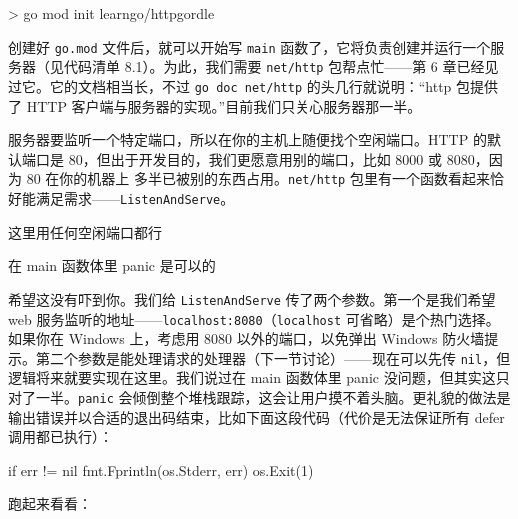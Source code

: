 \begin{shellcode}[]
> go mod init learngo/httpgordle
\end{shellcode}

创建好 \texttt{go.mod} 文件后，就可以开始写 \texttt{main} 函数了，它将负责创建并运行一个服务器（见代码清单 8.1）。为此，我们需要 \texttt{net/http} 包帮点忙——第 6 章已经见过它。它的文档相当长，不过 \texttt{go doc net/http} 的头几行就说明：``http 包提供了 HTTP 客户端与服务器的实现。''目前我们只关心服务器那一半。

服务器要监听一个特定端口，所以在你的主机上随便找个空闲端口。HTTP 的默认端口是 80，但出于开发目的，我们更愿意用别的端口，比如 8000 或 8080，因为 80 在你的机器上
多半已被别的东西占用。\texttt{net/http} 包里有一个函数看起来恰好能满足需求——\texttt{ListenAndServe}。


\begin{codeannotations}
\item 这里用任何空闲端口都行
\item 在 main 函数体里 panic 是可以的
\end{codeannotations}

希望这没有吓到你。我们给 \texttt{ListenAndServe} 传了两个参数。第一个是我们希望 web 服务监听的地址——\texttt{localhost:8080}（\texttt{localhost} 可省略）是个热门选择。如果你在 Windows 上，考虑用 8080 以外的端口，以免弹出 Windows 防火墙提示。第二个参数是能处理请求的处理器（下一节讨论）——现在可以先传 \texttt{nil}，但逻辑将来就要实现在这里。我们说过在 main 函数体里 panic 没问题，但其实这只对了一半。\texttt{panic} 会倾倒整个堆栈跟踪，这会让用户摸不着头脑。更礼貌的做法是输出错误并以合适的退出码结束，比如下面这段代码（代价是无法保证所有 defer 调用都已执行）：

\begin{gocode}[]
if err != nil {
    fmt.Fprintln(os.Stderr, err)
    os.Exit(1)
}
\end{gocode}

跑起来看看：

